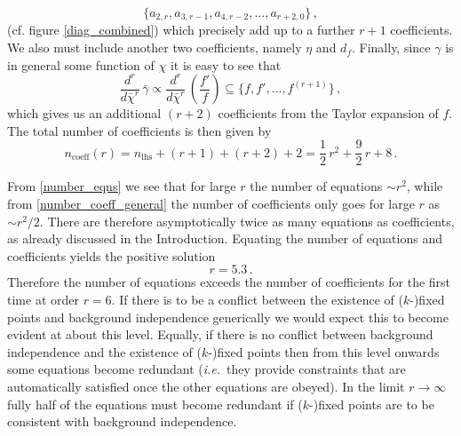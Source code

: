 \documentclass[11pt]{book} %
\newcommand\ie{\textit{i.e.}\ }
\begin{document}
\begin{equation}
\bigg\lbrace a_{2,r}, a_{3,r-1}, a_{4,r-2}, \dots, a_{r+2,0}   \bigg\rbrace \,,
\end{equation}
(cf. figure \ref{diag_combined}) which precisely add up to a further $r+1$ coefficients. We also must include another two coefficients, namely $\eta$ and $d_f$.
Finally, since $\gamma$ is in general some function of $\chi$ it is easy to see that
\begin{equation}
\frac{d^r}{d \bar\chi^r} \, \bar{\gamma} \propto \frac{d^r}{d \bar\chi^r} \, \left( \frac{f'}{f}\right) \subseteq
\bigg\lbrace f, f', \dots, f^{(r+1)}   \bigg\rbrace \,,
\end{equation}
which gives us an additional $(r+2)$ coefficients from the Taylor expansion of $f$. The total number of coefficients is then given by
\begin{equation}
\label{number_coeff_general}
n_{\text{coeff}}(r) = n_{\text{lhs}} + (r+1) + (r+2) + 2  = \frac{1}{2} \, r^2 + \frac{9}{2} \, r + 8 \,.
\end{equation}

From \eqref{number_eqns} we see that for large $r$ the number of equations $\sim r^2$, while from \eqref{number_coeff_general} the number of coefficients only goes for large $r$ as $\sim r^2/2$. There are therefore asymptotically twice as many equations as coefficients, as already discussed in the Introduction.
Equating the number of equations and coefficients yields the positive solution
\begin{equation}
r = 5.3 \,.
\end{equation}
Therefore the number of equations exceeds the number of coefficients for the first time at order $r=6$. If there is to be a conflict between the existence of ($k$-)fixed points and background independence generically we would expect this to become evident at about this level.  Equally, if there is no conflict between background independence and the existence of ($k$-)fixed points then from this level onwards some equations become redundant (\ie they provide constraints that are automatically satisfied once the other equations are obeyed). In the limit $r\to\infty$ fully half of the equations must become redundant if ($k$-)fixed points are to be consistent with background independence.
\end{document}
